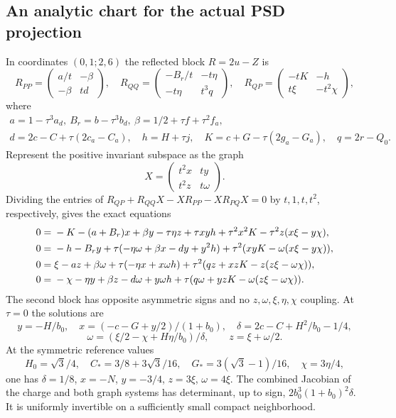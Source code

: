 \documentclass[11pt]{article}
\theoremstyle{remark}\newtheorem{remark}[theorem]{Remark}
\numberwithin{equation}{section}
\begin{document}
\subsection{An analytic chart for the actual PSD projection}\label{sec:chart}
In coordinates $(0,1;2,6)$ the reflected block $R=2u-Z$ is
\begin{equation}\label{eq:Rblocks}
 R_{PP}=\begin{pmatrix}a/t&-\beta\\-\beta&td\end{pmatrix},\quad
 R_{QQ}=\begin{pmatrix}-B_r/t&-t\eta\\-t\eta&t^3q\end{pmatrix},\quad
 R_{QP}=\begin{pmatrix}-tK&-h\\t\xi&-t^2\chi\end{pmatrix},
\end{equation}
where
\begin{gather*}
 a=1-\tau^3a_d,\ B_r=b-\tau^3b_d,\ \beta=1/2+\tau f+\tau^2f_a,\\
 d=2c-C+\tau(2c_a-C_a),\quad h=H+\tau j,\quad
 K=c+G-\tau(2g_a-G_a),\quad q=2r-Q_0.
\end{gather*}
Represent the positive invariant subspace as the graph
\[
 X=\begin{pmatrix}t^2x&ty\\t^2z&t\omega\end{pmatrix}.
\]
Dividing the entries of $R_{QP}+R_{QQ}X-XR_{PP}-XR_{PQ}X=0$ by $t,1,t,t^2$, respectively, gives the exact equations
\begin{align}\label{eq:riccati}
0={}&-K-(a+B_r)x+\beta y-\tau\eta z+\tau xyh+\tau^2x^2K-\tau^2z(x\xi-y\chi),\\
0={}&-h-B_ry+\tau(-\eta\omega+\beta x-dy+y^2h)
 +\tau^2(xyK-\omega(x\xi-y\chi)),\notag\\
0={}&\xi-az+\beta\omega+\tau(-\eta x+x\omega h)
 +\tau^2(qz+xzK-z(z\xi-\omega\chi)),\notag\\
0={}&-\chi-\eta y+\beta z-d\omega+y\omega h
 +\tau(q\omega+yzK-\omega(z\xi-\omega\chi)).\notag
\end{align}
The second block has opposite asymmetric signs and no $z,\omega,\xi,\eta,\chi$ coupling. At $\tau=0$ the solutions are
\[
 y=-H/b_0,\quad x=(-c-G+y/2)/(1+b_0),\quad
 \delta=2c-C+H^2/b_0-1/4,
\]
\[
 \omega=(\xi/2-\chi+H\eta/b_0)/\delta,\qquad z=\xi+\omega/2.
\]
At the symmetric reference values
\[
 H_0=\sqrt3/4,\quad C_*=3/8+3\sqrt3/16,\quad
 G_*=3(\sqrt3-1)/16,\quad\chi=3\eta/4,
\]
one has $\delta=1/8$, $x=-N$, $y=-3/4$, $z=3\xi$, $\omega=4\xi$. The combined Jacobian of the charge and both graph systems has determinant, up to sign, $2b_0^3(1+b_0)^2\delta$. It is uniformly invertible on a sufficiently small compact neighborhood.
\end{document}
